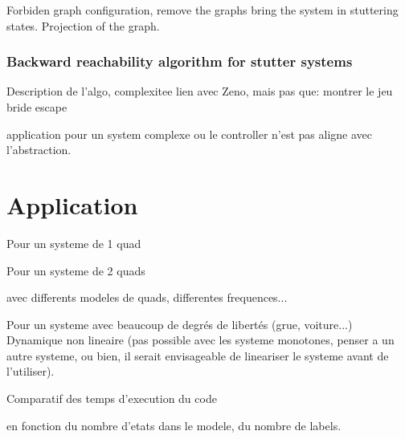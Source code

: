 \documentclass{report}
\begin{document}
Forbiden graph configuration, remove the graphs bring the system in stuttering states.
Projection of the graph.

\subsubsection*{Backward reachability algorithm for stutter systems}

Description de l'algo, complexitee
lien avec Zeno, mais pas que: montrer le jeu bride escape

application pour un system complexe ou le controller n'est pas aligne avec l'abstraction.


\section*{Application}

Pour un systeme de 1 quad

Pour un systeme de 2 quads

avec differents modeles de quads, differentes frequences...

Pour un systeme avec beaucoup de degrés de libertés (grue, voiture...)
Dynamique non lineaire (pas possible avec les systeme monotones, penser a un autre systeme, ou bien, il serait envisageable de lineariser le systeme avant de l'utiliser).

Comparatif des temps d'execution du code

en fonction du nombre d'etats dans le modele, du nombre de labels.
\end{document}
